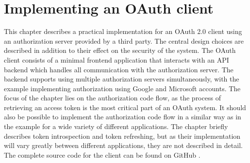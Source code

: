 \clearpage

\section{Implementing an OAuth client}
\label{sec:implementation}
This chapter describes a practical implementation for an OAuth 2.0 client using an authorization server provided by a third party.
The central design choices are described in addition to their effect on the security of the system.
The OAuth client consists of a minimal frontend application that interacts with an API backend which handles all communication with the authorization server.
The backend supports using multiple authorization servers simultaneously, with the example implementing authorization using Google and Microsoft accounts.
The focus of the chapter lies on the authorization code flow, as the process of retrieving an access token is the most critical part of an OAuth system.
It should also be possible to implement the authorization code flow in a similar way as in the example for a wide variety of different applications.
The chapter briefly describes token introspection and token refreshing, but as their implementation will vary greatly between different applications, they are not described in detail.
The complete source code for the client can be found on GitHub \citep{noauthor_backjonasoauth-client_nodate}.
 





